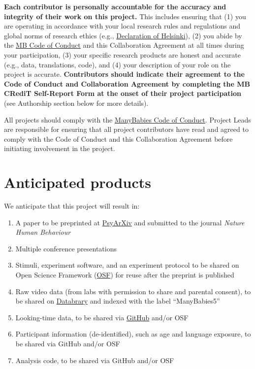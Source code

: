 \documentclass[
  letterpaper,
  DIV=11,
  numbers=noendperiod,
  oneside]{scrreprt}
\providecommand{\tightlist}{%
  \setlength{\itemsep}{0pt}\setlength{\parskip}{0pt}}
\begin{document}

\textbf{Each contributor is personally accountable for the accuracy and
integrity of their work on this project.} This includes ensuring that
(1) you are operating in accordance with your local research rules and
regulations and global norms of research ethics (e.g.,
\href{https://www.wma.net/policies-post/wma-declaration-of-helsinki-ethical-principles-for-medical-research-involving-human-subjects/}{Declaration
of Helsinki}), (2) you abide by the
\href{https://manybabies.org/codeofconduct/}{MB Code of Conduct} and
this Collaboration Agreement at all times during your participation, (3)
your specific research products are honest and accurate (e.g., data,
translations, code), and (4) your description of your role on the
project is accurate. \textbf{Contributors should indicate their
agreement to the Code of Conduct and Collaboration Agreement by
completing the MB CRediT Self-Report Form at the onset of their project
participation} (see Authorship section below for more details).

All projects should comply with the
\href{https://manybabies.org/codeofconduct/}{ManyBabies Code of
Conduct}. Project Leads are responsible for ensuring that all project
contributors have read and agreed to comply with the Code of Conduct and
this Collaboration Agreement before initiating involvement in the
project.

\section*{Anticipated products}\label{anticipated-products}


We anticipate that this project will result in:

\begin{enumerate}
\def\labelenumi{\arabic{enumi}.}
\tightlist
\item
  A paper to be preprinted at \href{https://psyarxiv.com}{PsyArXiv} and
  submitted to the journal \emph{Nature Human Behaviour}
\item
  Multiple conference presentations
\item
  Stimuli, experiment software, and an experiment protocol to be shared
  on Open Science Framework (\href{https://osf.io/}{OSF}) for reuse
  after the preprint is published
\item
  Raw video data (from labs with permission to share and parental
  consent), to be shared on \href{https://nyu.databrary.org/}{Databrary}
  and indexed with the label ``ManyBabies5''
\item
  Looking-time data, to be shared via
  \href{https://pages.github.com/}{GitHub} and/or OSF
\item
  Participant information (de-identified), such as age and language
  exposure, to be shared via GitHub and/or OSF
\item
  Analysis code, to be shared via GitHub and/or OSF
\end{enumerate}
\end{document}
